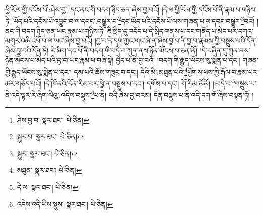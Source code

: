 ཕྱི་རོལ་གྱི་དངོས་པོ་:ཤེས་བྱ་\footnote{ཤེས་བྱ་བ་  སྣར་ཐང་།  པེ་ཅིན། }དང་ནང་གི་བདག་ཉིད་ཅན་ཞེས་བྱ་བའོ། །དེ་ལ་ཕྱི་རོལ་གྱི་དངོས་པོ་ནི་རྣམ་པ་གཉིས་ཏེ། ཡོད་པའི་དངོས་པོ་འབྱུང་བ་ལ་དབང་:བསྒྱུར་བ་\footnote{སྒྱུར་བ་  སྣར་ཐང་།  པེ་ཅིན། }དང་ཡོད་པའི་དངོས་པོ་ལས་གཞན་པ་ལ་དབང་བསྒྱུར་\footnote{སྒྱུར་  སྣར་ཐང་།  པེ་ཅིན། }བའོ། །ནང་གི་བདག་ཉིད་ཅན་ཡང་རྣམ་པ་གཉིས་ཏེ། ཇི་སྲིད་དུ་འདོད་པ་དེ་སྲིད་གནས་པ་དང་གནོད་པ་མེད་པར་དགའ་མགུར་འཆི་འཕོ་བ་ལ་ཡང་ཞེས་བྱ་བའོ། །བྱ་བ་དེ་དག་ཀྱང་གང་ཞེ་ན་ཞེས་བྱ་བ་ནི་བྱ་བ་རྣམས་ཀྱི་བསྡུས་པའི་དོན་ཞེས་བྱ་བའི་དོན་ཏེ། རེ་ཞིག་དང་པོ་ནི་བདག་གི་བདེ་བ་ཀུན་ནས་ཉོན་མོངས་པ་ཅན་ནོ། །དེ་བཞིན་དུ་ཀུན་ནས་ཉོན་མོངས་པ་མེད་པའི་བྱ་བ་ཡང་རྣམ་པ་བཞི་སྟེ། བྱེད་པ་ནི་བྱ་བའོ། །བདག་གི་རྒྱུད་ཡོངས་སུ་སྨིན་པ་དང་། གཞན་གྱི་རྒྱུད་ཡོངས་སུ་སྨིན་པ་དང་། དམ་པའི་ཆོས་གཟུང་བ་དང་། དེའི་མི་:མཐུན་པའི་\footnote{མཐུན་  སྣར་ཐང་།  པེ་ཅིན། }ཕྱོགས་ཕས་ཀྱི་རྒོལ་བ་རྣམ་པར་ཚར་གཅོད་པའོ། །དེ་ཁོ་ནའི་དོན་རིམ་པར་ཕྱེ་ན་བསྡུས་པ་དང་། དགོས་པ་དང་། གོ་རིམ་མོམོ། །:བདེ་བ་\footnote{དེ་ལ་  སྣར་ཐང་།  པེ་ཅིན། }བསྡུས་པ་ནི་འདི་ལྟར་རེ་ཞིག་ལེའུ་:འདིས་བསྡུས་\footnote{འདིས་འདི་ཡིས་སྡུས་  སྣར་ཐང་།  པེ་ཅིན། }པ་ནི། འདི་ཞེས་བྱ་བའམ། དོན་བསྡུས་པ་ནི་འདི་དག་གོ་ཞེས་བསྟན་ཏོ། །
